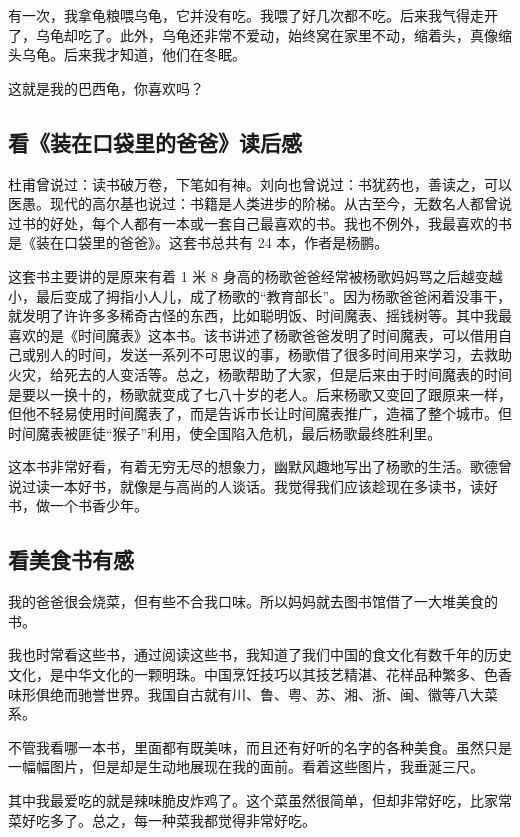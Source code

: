 \documentclass[UTF8,a4paper,titlepage,twoside,10.5pt]{article}
\begin{document}
有一次，我拿龟粮喂乌龟，它并没有吃。我喂了好几次都不吃。后来我气得走开了，乌龟却吃了。此外，乌龟还非常不爱动，始终窝在家里不动，缩着头，真像缩头乌龟。后来我才知道，他们在冬眠。

这就是我的巴西龟，你喜欢吗？

\subsection{看《装在口袋里的爸爸》读后感}
\label{sec:org17981c6}

杜甫曾说过：读书破万卷，下笔如有神。刘向也曾说过：书犹药也，善读之，可以医愚。现代的高尔基也说过：书籍是人类进步的阶梯。从古至今，无数名人都曾说过书的好处，每个人都有一本或一套自己最喜欢的书。我也不例外，我最喜欢的书是《装在口袋里的爸爸》。这套书总共有 24 本，作者是杨鹏。

这套书主要讲的是原来有着 1 米 8 身高的杨歌爸爸经常被杨歌妈妈骂之后越变越小，最后变成了拇指小人儿，成了杨歌的“教育部长”。因为杨歌爸爸闲着没事干，就发明了许许多多稀奇古怪的东西，比如聪明饭、时间魔表、摇钱树等。其中我最喜欢的是《时间魔表》这本书。该书讲述了杨歌爸爸发明了时间魔表，可以借用自己或别人的时间，发送一系列不可思议的事，杨歌借了很多时间用来学习，去救助火灾，给死去的人变活等。总之，杨歌帮助了大家，但是后来由于时间魔表的时间是要以一换十的，杨歌就变成了七八十岁的老人。后来杨歌又变回了跟原来一样，但他不轻易使用时间魔表了，而是告诉市长让时间魔表推广，造福了整个城市。但时间魔表被匪徒“猴子”利用，使全国陷入危机，最后杨歌最终胜利里。

这本书非常好看，有着无穷无尽的想象力，幽默风趣地写出了杨歌的生活。歌德曾说过读一本好书，就像是与高尚的人谈话。我觉得我们应该趁现在多读书，读好书，做一个书香少年。

\subsection{看美食书有感}
\label{sec:org83a1f67}

我的爸爸很会烧菜，但有些不合我口味。所以妈妈就去图书馆借了一大堆美食的书。

我也时常看这些书，通过阅读这些书，我知道了我们中国的食文化有数千年的历史文化，是中华文化的一颗明珠。中国烹饪技巧以其技艺精湛、花样品种繁多、色香味形俱绝而驰誉世界。我国自古就有川、鲁、粤、苏、湘、浙、闽、徽等八大菜系。

不管我看哪一本书，里面都有既美味，而且还有好听的名字的各种美食。虽然只是一幅幅图片，但是却是生动地展现在我的面前。看着这些图片，我垂涎三尺。

其中我最爱吃的就是辣味脆皮炸鸡了。这个菜虽然很简单，但却非常好吃，比家常菜好吃多了。总之，每一种菜我都觉得非常好吃。
\end{document}
